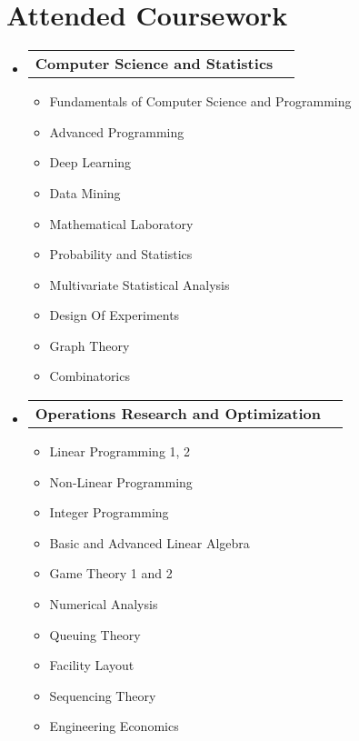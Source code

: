 \documentclass[letterpaper,11pt]{article}
\makeatletter
\newcommand{\resumeProjectHeading}[2]{
    \item
    \begin{tabular*}{1.001\textwidth}{l@{\extracolsep{\fill}}r}
      \small#1 & \textbf{\small #2}\\
    \end{tabular*}\vspace{-7pt}
}
\newcommand{\resumeSubHeadingListStart}{\begin{itemize}[leftmargin=0.0in, label={}]}
\newcommand{\resumeSubHeadingListEnd}{\end{itemize}}
\makeatother
\begin{document}
\section{Attended Coursework}
    \resumeSubHeadingListStart
        \resumeProjectHeading
          {\textbf{Computer Science and Statistics} \emph{}}{}
            \begin{multicols}{4}
                \begin{itemize}[itemsep=-5pt, parsep=3pt]
                    \item\small Fundamentals of Computer Science and Programming
                    \item Advanced Programming
                    \item Deep Learning
                    \item Data Mining
                    \item Mathematical Laboratory 
                    \item Probability and Statistics
                    \item Multivariate Statistical Analysis
                    \item Design Of Experiments
                    \item Graph Theory
                    \item Combinatorics
                \end{itemize}
            \end{multicols}
            \vspace*{2.0\multicolsep}
        \resumeProjectHeading
          {\textbf{Operations Research and Optimization} \emph{}}{}
            \begin{multicols}{4}
                \begin{itemize}[itemsep=-5pt, parsep=3pt]
                    \item\small Linear Programming 1, 2
                    \item Non-Linear Programming
                    \item Integer Programming
                    \item Basic and Advanced Linear Algebra
                    \item Game Theory 1 and 2
                    \item Numerical Analysis
                    \item Queuing Theory
                    \item Facility Layout
                    \item Sequencing Theory
                    \item Engineering Economics
                \end{itemize}
            \end{multicols}
            \vspace*{2.0\multicolsep}
    \resumeSubHeadingListEnd
\vspace{-5pt}
\end{document}
